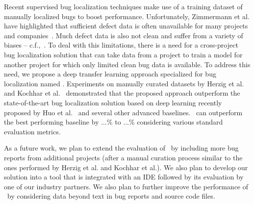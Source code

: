 Recent supervised bug localization techniques make use of a training dataset of manually localized bugs to boost performance. Unfortunately, Zimmermann et al. have highlighted that sufficient defect data is often unavailable for many projects and companies~\cite{ZimmermannNGGM09}. Much defect data is also not clean and suffer from a variety of biases -- c.f.,~\cite{HerzigJZ13,KochharTL14,BachmannBRDB10,BirdBADBFD09}. To deal with this limitations, there is a need for a cross-project bug localization solution that can take data from a project to train a model for another project for which only limited clean bug data is available. To address this need, we propose a deep transfer learning approach specialized for bug localization named \TRANPCNN.  Experiments on manually curated datasets by Herzig et al.~\cite{HerzigJZ13} and Kochhar et al.~\cite{KochharTL14} demonstrated that the proposed approach outperform the state-of-the-art bug localization solution based on deep learning recently proposed by Huo et al.~\cite{huo2016learning} and several other advanced baselines. \TRANPCNN\ can outperform the best performing baseline by ...\% to ...\% considering various standard evaluation metrics.

As a future work, we plan to extend the evaluation of \TRANPCNN\ by including more bug reports from additional projects (after a manual curation process similar to the ones performed by Herzig et al. and Kochhar et al.). We also plan to develop our solution into a tool that is integrated with an IDE followed by its evaluation by one of our industry partners. We also plan to further improve the performance of \TRANPCNN\ by considering data beyond text in bug reports and source code files. 

